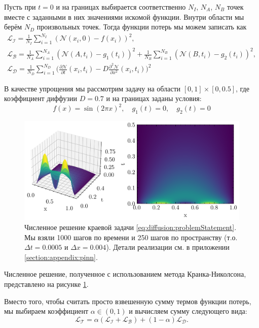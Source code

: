 \documentclass[a4paper, 12pt]{article}
\begin{document}
Пусть при $t = 0$ и на границах выбирается соответственно $N_I$, $N_A$, $N_B$ точек вместе с заданными в них значениями искомой функции. Внутри области мы берём $N_D$ произвольных точек. Тогда функции потерь мы можем записать как
\begin{equation} \label{eq:diffusion:loss}
\begin{gathered}
    \mathcal{L_I} = \frac{1}{N_I}\sum_{i=1}^{N_I} (\mathcal{N}(x_i, 0) - f(x_i))^2,\\
    \mathcal{L_B} = \frac{1}{N_A}\sum_{i=1}^{N_A} (\mathcal{N}(A, t_i) - g_1(t_i))^2 + \frac{1}{N_B}\sum_{i=1}^{N_B} (\mathcal{N}(B, t_i) - g_2(t_i))^2,\\
    \mathcal{L_D} = \frac{1}{N_D}\sum_{i=1}^{N_D} \Big(\frac{\partial \mathcal{N}}{\partial t}(x_i, t_i) - D \frac{\partial^2 \mathcal{N}}{\partial x^2}(x_i, t_i)\Big)^2
\end{gathered}
\end{equation}

В качестве упрощения мы рассмотрим задачу на области $[0, 1] \times [0, 0.5]$, где коэффициент диффузии $D = 0.7$ и на границах заданы условия:
$$
f(x) = \sin(2 \pi x)^2, \quad g_1(t) = 0, \quad g_2(t) = 0
$$

\begin{figure}
    \centering
    \includegraphics{../images/diffusion/Numerical solution.png}
    \caption{Численное решение краевой задачи \ref{eq:diffusion:problemStatement}. Мы взяли 1000 шагов по времени и 250 шагов по пространству (т.о. $\Delta t = 0.0005$ и $\Delta x = 0.004$). Детали реализации см. в приложении \ref{section:appendix:pinn}.}
    \label{fig:diffusion:numerical}
\end{figure}

Численное решение, полученное с использованием метода Кранка-Николсона, представлено на рисунке \ref{fig:diffusion:numerical}. 

Вместо того, чтобы считать просто взвешенную сумму термов функции потерь, мы выбираем коэффициент $\alpha \in (0, 1)$ и вычисляем сумму следующего вида:
$$
\mathcal{L_T} = \alpha (\mathcal{L_I} + \mathcal{L_B}) + (1 - \alpha) \mathcal{L_D}.
$$
\end{document}

